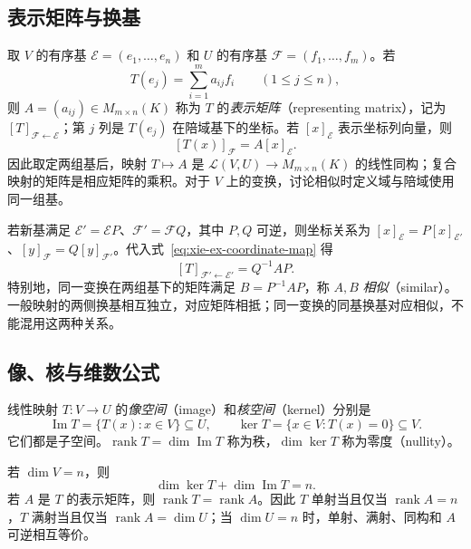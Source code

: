 \subsection{表示矩阵与换基}

取 $V$ 的有序基 $\mathcal E=(e_1,\ldots,e_n)$ 和 $U$ 的有序基 $\mathcal F=(f_1,\ldots,f_m)$。若
\[
    T(e_j)=\sum_{i=1}^{m}a_{ij}f_i\qquad(1\leq j\leq n),
\]
则 $A=(a_{ij})\in M_{m\times n}(K)$ 称为 $T$ 的\emph{表示矩阵}（representing matrix），记为 $[T]_{\mathcal F\leftarrow\mathcal E}$；第 $j$ 列是 $T(e_j)$ 在陪域基下的坐标。若 $[x]_{\mathcal E}$ 表示坐标列向量，则
\begin{equation}
\label{eq:xie-ex-coordinate-map}
    [T(x)]_{\mathcal F}=A[x]_{\mathcal E}.
\end{equation}
因此取定两组基后，映射 $T\mapsto A$ 是 $\mathcal L(V,U)\to M_{m\times n}(K)$ 的线性同构；复合映射的矩阵是相应矩阵的乘积。对于 $V$ 上的变换，讨论相似时定义域与陪域使用同一组基。

若新基满足 $\mathcal E'=\mathcal E P$、$\mathcal F'=\mathcal F Q$，其中 $P,Q$ 可逆，则坐标关系为 $[x]_{\mathcal E}=P[x]_{\mathcal E'}$、$[y]_{\mathcal F}=Q[y]_{\mathcal F'}$。代入式~\eqref{eq:xie-ex-coordinate-map} 得
\begin{equation}
\label{eq:xie-ex-general-change-basis}
    [T]_{\mathcal F'\leftarrow\mathcal E'}=Q^{-1}AP.
\end{equation}
特别地，同一变换在两组基下的矩阵满足 $B=P^{-1}AP$，称 $A,B$ \emph{相似}（similar）。一般映射的两侧换基相互独立，对应矩阵相抵；同一变换的同基换基对应相似，不能混用这两种关系。

\subsection{像、核与维数公式}

\begin{definition}
\label{def:xie-ex-image-kernel}
线性映射 $T:V\to U$ 的\emph{像空间}（image）和\emph{核空间}（kernel）分别是
\[
    \operatorname{Im}T=\{T(x):x\in V\}\subseteq U,
    \qquad \ker T=\{x\in V:T(x)=0\}\subseteq V.
\]
它们都是子空间。$\operatorname{rank}T=\dim\operatorname{Im}T$ 称为秩，$\dim\ker T$ 称为零度（nullity）。
\end{definition}

\begin{theorem}
\label{thm:xie-ex-rank-nullity}
若 $\dim V=n$，则
\begin{equation}
\label{eq:xie-ex-rank-nullity}
    \dim\ker T+\dim\operatorname{Im}T=n.
\end{equation}
若 $A$ 是 $T$ 的表示矩阵，则 $\operatorname{rank}T=\operatorname{rank}A$。因此 $T$ 单射当且仅当 $\operatorname{rank}A=n$，$T$ 满射当且仅当 $\operatorname{rank}A=\dim U$；当 $\dim U=n$ 时，单射、满射、同构和 $A$ 可逆相互等价。
\end{theorem}

